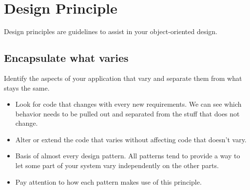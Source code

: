 \documentclass[11pt]{article}
\begin{document}
    \section{Design Principle}
    Design principles are guidelines to assist in your object-oriented design.

    \subsection{Encapsulate what varies}
    Identify the aspects of your application that vary and separate them from what stays the same.
    \begin{itemize}
        \item Look for code that changes with every new requirements. We can see which behavior needs to be pulled out
        and separated from the stuff that does not change.
        \item Alter or extend the code that varies without affecting code that doesn't vary.
        \item Basis of almost every design pattern. All patterns tend to provide a way to let some part of your system
        vary independently on the other parts.
        \item Pay attention to how each pattern makes use of this principle.
    \end{itemize}
\end{document}
